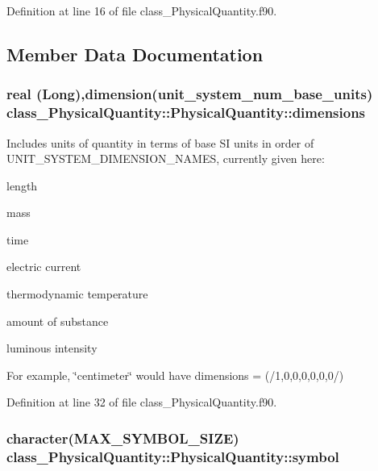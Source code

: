 Definition at line 16 of file class\_\-PhysicalQuantity.f90.



\subsection{Member Data Documentation}
\hypertarget{typeclass__PhysicalQuantity_1_1PhysicalQuantity_a00edddafb9d19f2dfa9308fd03a4f46a}{
\subsubsection[{dimensions}]{\setlength{\rightskip}{0pt plus 5cm}real (Long),dimension(unit\_\-system\_\-num\_\-base\_\-units) {\bf class\_\-PhysicalQuantity::PhysicalQuantity::dimensions}}}
\label{typeclass__PhysicalQuantity_1_1PhysicalQuantity_a00edddafb9d19f2dfa9308fd03a4f46a}


Includes units of quantity in terms of base SI units in order of UNIT\_\-SYSTEM\_\-DIMENSION\_\-NAMES, currently given here: 


\begin{DoxyEnumerate}
\item length
\item mass
\item time
\item electric current
\item thermodynamic temperature
\item amount of substance
\item luminous intensity
\end{DoxyEnumerate}

For example, \char`\"{}centimeter\char`\"{} would have dimensions = (/1,0,0,0,0,0,0/) 

Definition at line 32 of file class\_\-PhysicalQuantity.f90.

\hypertarget{typeclass__PhysicalQuantity_1_1PhysicalQuantity_aeff76900f557015cca225673641d17e8}{
\subsubsection[{symbol}]{\setlength{\rightskip}{0pt plus 5cm}character({\bf MAX\_\-SYMBOL\_\-SIZE}) {\bf class\_\-PhysicalQuantity::PhysicalQuantity::symbol}}}
\label{typeclass__PhysicalQuantity_1_1PhysicalQuantity_aeff76900f557015cca225673641d17e8}


